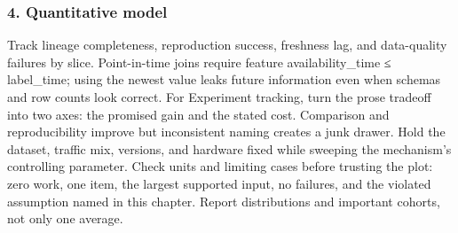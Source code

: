 \subsubsection*{4. Quantitative model}
Track lineage completeness, reproduction success, freshness lag, and data-quality failures by slice. Point-in-time joins require feature availability\_time ≤ label\_time; using the newest value leaks future information even when schemas and row counts look correct.
For Experiment tracking, turn the prose tradeoff into two axes: the promised gain and the stated cost. Comparison and reproducibility improve but inconsistent naming creates a junk drawer. Hold the dataset, traffic mix, versions, and hardware fixed while sweeping the mechanism's controlling parameter.
Check units and limiting cases before trusting the plot: zero work, one item, the largest supported input, no failures, and the violated assumption named in this chapter. Report distributions and important cohorts, not only one average.
